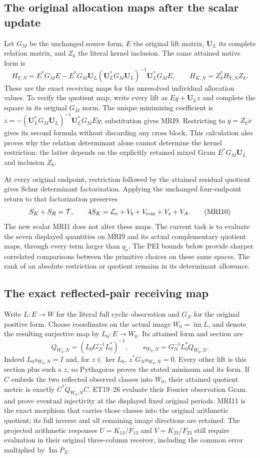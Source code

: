 \subsection{The original allocation maps after the scalar update}
Let $G_M$ be the unchanged source form, $E$ the original lift matrix,
$\mathbf U_L$ its complete relation matrix, and $Z_k$ the literal
kernel inclusion. The same attained native form is
\[
 H_{Y,N}=E^*G_ME-E^*G_M\mathbf U_L
    (\mathbf U_L^*G_M\mathbf U_L)^{-1}\mathbf U_L^*G_ME,
 \qquad H_{K,N}=Z_k^*H_{Y,N}Z_k.
 \tag{MRI9}
\]
These are the exact receiving maps for the unresolved individual
allocation values. To verify the quotient map, write every lift as
$Ey+\mathbf U_Lz$ and complete the square in its original $G_M$
norm. The unique minimizing coefficient is
$z=-(\mathbf U_L^*G_M\mathbf U_L)^{-1}\mathbf U_L^*G_MEy$;
substitution gives MRI9. Restricting to $y=Z_kx$ gives its second
formula without discarding any cross block. This calculation also
proves why the relation determinant alone cannot determine the
kernel restriction: the latter depends on the explicitly retained
mixed Gram $E^*G_M\mathbf U_L$ and inclusion $Z_k$.

At every original endpoint, restriction followed by the attained
residual quotient gives Schur determinant factorization. Applying
the unchanged four-endpoint return to that factorization preserves
\[
 S_K+S_R=\mathcal T,\qquad
 4S_K=\mathcal L_e+V_b+V_{\rm rem}+V_s+V_A.
 \tag{MRI10}
\]
The new scalar MRI1 does not alter these maps. The current task is
to evaluate the seven displayed quantities on MRI9 and its actual
complementary quotient maps, through every term larger than $q_a$.
The PEI bounds below provide sharper correlated comparisons between
the primitive choices on these same spaces. The rank of an absolute
restriction or quotient remains in its determinant allowance.

\subsection{The exact reflected-pair receiving map}
Write $L:E\to W$ for the literal full cyclic observation and
$G_N$ for the original positive form. Choose coordinates on the
actual image $W_0=\operatorname{im}L$, and denote the resulting
surjective map by $L_0:E\to W_0$. Its attained form and section are
\[
 Q_{W_0,N}=(L_0G_N^{-1}L_0^*)^{-1},\qquad
 s_{W_0,N}=G_N^{-1}L_0^*Q_{W_0,N}.
 \tag{MRI11}
\]
Indeed $L_0s_{W_0,N}=I$ and, for $z\in\ker L_0$,
$z^*G_Ns_{W_0,N}=0$. Every other lift is this section plus such a
$z$, so Pythagoras proves the stated minimum and its form.
If $C$ embeds the two reflected observed classes into $W_0$, their
attained quotient metric is exactly $C^*Q_{W_0,N}C$. ET19--26
evaluate their Fourier observation Gram and prove eventual
injectivity at the displayed fixed original periods. MRI11 is
the exact morphism that carries those classes into the original
arithmetic quotient; its full inverse and all remaining image
directions are retained. The projected arithmetic responses
$U=K_{13}/F_{13}$ and $V=K_{23}/F_{23}$ still require evaluation
in their original three-column receiver, including the common
error multiplied by $\operatorname{Im}P_X$.

